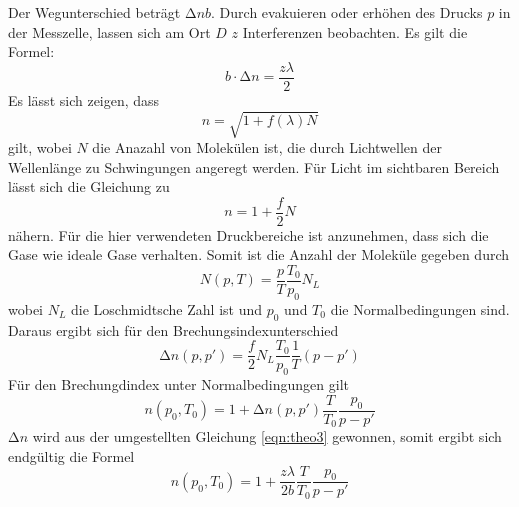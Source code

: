 \FloatBarrier
Der Wegunterschied beträgt $\increment n b$.
Durch evakuieren oder erhöhen des Drucks $p$ in der Messzelle, lassen sich am Ort $D$ $z$ Interferenzen beobachten.
Es gilt die Formel:
\begin{equation}
    b \cdot \increment n = \frac{z \lambda}{2}
    \label{eqn:theo3}
\end{equation}
Es lässt sich zeigen, dass
\begin{equation}
    n = \sqrt{1+f(\lambda)N}
\end{equation}
gilt, wobei $N$ die Anazahl von Molekülen ist, die durch Lichtwellen der Wellenlänge zu Schwingungen angeregt werden.
Für Licht im sichtbaren Bereich lässt sich die Gleichung zu
\begin{equation}
    n = 1 + \frac{f}{2}N
\end{equation}
nähern.
Für die hier verwendeten Druckbereiche ist anzunehmen, dass sich die Gase wie ideale Gase verhalten.
Somit ist die Anzahl der Moleküle gegeben durch
\begin{equation}
    N(p,T) = \frac{p}{T} \frac{T_0}{p_0}N_L
\end{equation}
wobei $N_L$ die Loschmidtsche Zahl ist und $p_0$ und $T_0$ die Normalbedingungen sind.
Daraus ergibt sich für den Brechungsindexunterschied
\begin{equation}
    \increment n(p,p') = \frac{f}{2} N_L \frac{T_0}{p_0}\frac{1}{T}(p-p')
\end{equation}
Für den Brechungdindex unter Normalbedingungen gilt
\begin{equation}
    n(p_0,T_0) = 1 + \increment n(p,p') \frac{T}{T_0}\frac{p_0}{p-p'}
\end{equation}
$\increment n$ wird aus der umgestellten Gleichung \eqref{eqn:theo3} gewonnen, somit ergibt sich endgültig die Formel
\begin{equation}
    n(p_0,T_0) = 1 + \frac{z \lambda}{2b} \frac{T}{T_0} \frac{p_0}{p-p'}
    \label{eqn:gl2}
\end{equation}
